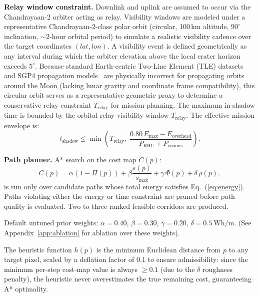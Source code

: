 \documentclass[10pt,conference]{IEEEtran}
\begin{document}
\textbf{Relay window constraint.}
Downlink and uplink are assumed to occur via the Chandrayaan-2
orbiter acting as relay.
Visibility windows are modeled under a representative Chandrayaan-2-class polar orbit (circular, 100\,km altitude, $90^\circ$ inclination, $\sim$2-hour orbital period) to simulate a realistic visibility cadence over the target coordinates $(lat, lon)$. A visibility event is defined geometrically as any interval during which the orbiter elevation above the local crater horizon exceeds $5^\circ$. Because standard Earth-centric Two-Line Element (TLE) datasets and SGP4 propagation models~\cite{vallado2006revisiting} are physically incorrect for propagating orbits around the Moon (lacking lunar gravity and coordinate frame compatibility), this circular orbit serves as a representative geometric proxy to determine a conservative relay constraint $T_{\mathrm{relay}}$ for mission planning.
The maximum in-shadow time is bounded by the orbital relay visibility
window $T_{\mathrm{relay}}$.
The effective mission envelope is:
\begin{equation}
t_{\mathrm{shadow}} \le \min\!\left(
  T_{\mathrm{relay}},\;\frac{0.80\,E_{\max} - E_{\mathrm{overhead}}}
  {P_{\mathrm{RHU}} + P_{\mathrm{comms}}}\right).
\label{eq:timebudget}
\end{equation}

\textbf{Path planner.}
A* search on the cost map $C(p)$:
\begin{equation}
C(p) = \alpha(1-\Pi(p)) + \beta\frac{s(p)}{s_{\max}} +
       \gamma\,\Phi(p) + \delta\,\rho(p),
\label{eq:cost}
\end{equation}
is run only over candidate paths whose total energy satisfies
Eq.~(\ref{eq:energy}).
Paths violating either the energy or time constraint are pruned before
path quality is evaluated.
Two to three ranked feasible corridors are produced.

Default untuned prior weights: $\alpha = 0.40$, $\beta = 0.30$, $\gamma = 0.20$,
$\delta = 0.5 \mathrm{\ Wh/m}$. (See Appendix~\ref{app:ablation} for ablation over these weights).

The heuristic function $h(p)$ is the minimum Euclidean distance from $p$ to any target pixel, scaled by a deflation factor of $0.1$ to ensure admissibility: since the minimum per-step cost-map value is always $\ge 0.1$ (due to the $\delta$ roughness penalty), the heuristic never overestimates the true remaining cost, guaranteeing A* optimality.
\end{document}
